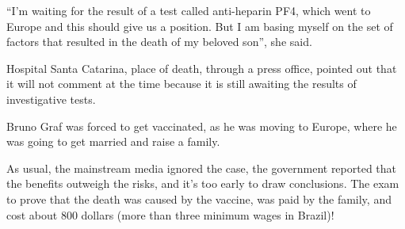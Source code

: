 “I’m waiting for the result of a test called anti-heparin PF4, which went to
Europe and this should give us a position. But I am basing myself on the set of
factors that resulted in the death of my beloved son”, she said.

Hospital Santa Catarina, place of death, through a press office, pointed out
that it will not comment at the time because it is still awaiting the results of
investigative tests.

Bruno Graf was forced to get vaccinated, as he was moving to Europe, where he
was going to get married and raise a family.

As usual, the mainstream media ignored the case, the government reported that
the benefits outweigh the risks, and it’s too early to draw conclusions. The
exam to prove that the death was caused by the vaccine, was paid by the family,
and cost about 800 dollars (more than three minimum wages in Brazil)!

